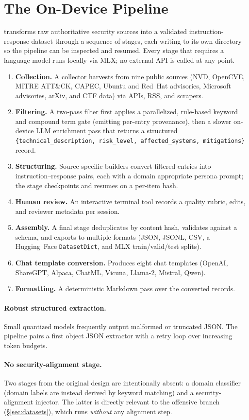 \section{The On-Device Pipeline}
\label{sec:pipeline}

\systemname{} transforms raw authoritative security sources into a validated
instruction-response dataset through a sequence of stages, each writing to its
own directory so the pipeline can be inspected and resumed. Every stage that
requires a language model runs locally via MLX; no external API is called at
any point.

\begin{enumerate}
  \item \textbf{Collection.} A collector harvests from nine public sources
  (NVD, OpenCVE, MITRE ATT\&CK, CAPEC, Ubuntu and Red~Hat advisories,
  Microsoft advisories, arXiv, and CTF data) via APIs, RSS, and scrapers.
  \item \textbf{Filtering.} A two-pass filter first applies a parallelized,
  rule-based keyword and compound term gate (emitting per-entry provenance),
  then a slower on-device LLM enrichment pass that returns a structured
  \texttt{\{technical\_\allowbreak description, risk\_\allowbreak level,
  affected\_\allowbreak systems, mitigations\}} record.
  \item \textbf{Structuring.} Source-specific builders convert filtered
  entries into instruction--response pairs, each with a domain appropriate
  persona prompt; the stage checkpoints and resumes on a per-item hash.
  \item \textbf{Human review.} An interactive terminal tool records a quality
  rubric, edits, and reviewer metadata per session.
  \item \textbf{Assembly.} A final stage deduplicates by content hash,
  validates against a schema, and exports to multiple formats (JSON, JSONL,
  CSV, a Hugging~Face \texttt{DatasetDict}, and MLX train/valid/test splits).
  \item \textbf{Chat template conversion.} Produces eight chat templates
  (OpenAI, ShareGPT, Alpaca, ChatML, Vicuna, Llama-2, Mistral, Qwen).
  \item \textbf{Formatting.} A deterministic Markdown pass over
  the converted records.
\end{enumerate}

\paragraph{Robust structured extraction.}
Small quantized models frequently output malformed or truncated JSON. The
pipeline pairs a first object JSON extractor with a retry loop over
increasing token budgets.

\paragraph{No security-alignment stage.}
Two stages from the original design are intentionally absent: a domain
classifier (domain labels are instead derived by keyword matching) and a
security-alignment injector. The latter is directly relevant to the offensive
branch (\S\ref{sec:datasets}), which runs \emph{without} any alignment step.
